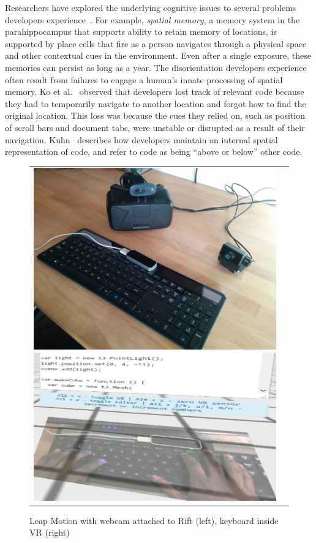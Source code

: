 \documentclass[conference]{IEEEtran}
\begin{document}
Researchers have explored the underlying cognitive issues to several problems developers experience~\cite{Parnin:2012}.
For example, \emph{spatial memory}, a memory system in the parahippocampus that supports ability to retain memory of locations, is supported by place cells that fire as a person navigates through a physical space and other contextual cues in the environment.  Even after a single exposure, these memories can persist as long as a year.  The disorientation developers experience often result from failures to engage a human's innate processing of spatial memory. Ko et al.~\cite{Ko:2006} observed that developers lost track of relevant code because they had to temporarily navigate to another location and forgot how to find the original location. This loss was because the cues they relied on, such as position of scroll bars and document tabs, were unstable or disrupted as a result of their navigation.  Kuhn~\cite{Kuhn:2010} describes how developers maintain an internal spatial representation of code, and refer to code as being ``above or below'' other code.

\begin{figure}[ht]
\centering
\begin{tabular}{cc}
	\includegraphics[width=.45\linewidth]{figures/setup/equipment}\label{fig:rift}
 	\includegraphics[width=.45\linewidth]{figures/setup/webcam_passthrough}\label{fig:leap}
\end{tabular}
\caption{Leap Motion with webcam attached to Rift (left), keyboard inside VR (right)}
\end{figure}
\end{document}
